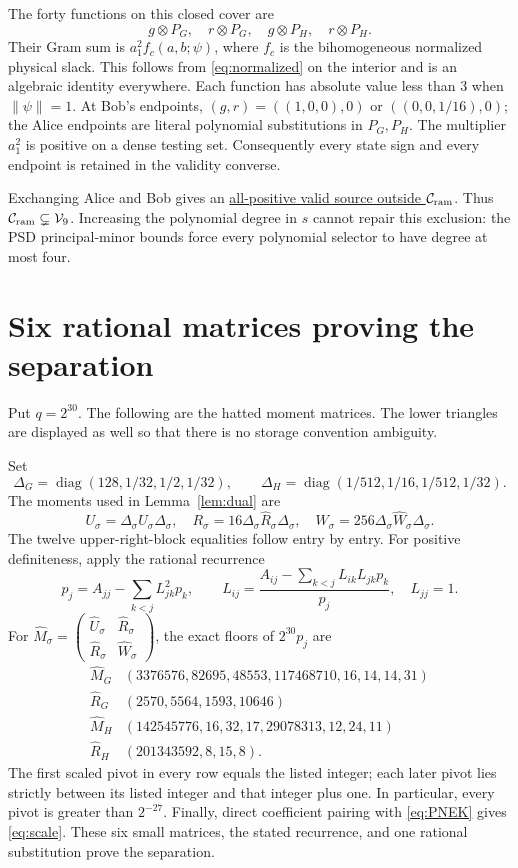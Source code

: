 \documentclass[10pt]{article}
\newcommand{\V}{\mathcal V_9}
\newcommand{\Cr}{\mathcal C_{\rm ram}}
\newcommand{\diag}{\operatorname{diag}}
\begin{document}
The forty functions on this closed cover are
\[
                 g\otimes P_G,\quad r\otimes P_G,
                 \quad g\otimes P_H,\quad r\otimes P_H.
\]
Their Gram sum is $a_1^2f_c(a,b;\psi)$, where $f_c$ is the bihomogeneous
normalized physical slack. This follows from \eqref{eq:normalized} on the
interior and is an algebraic identity everywhere. Each function has absolute
value less than $3$ when $\|\psi\|=1$. At Bob's endpoints,
$(g,r)=((1,0,0),0)$ or $((0,0,1/16),0)$; the Alice endpoints are literal
polynomial substitutions in $P_G,P_H$. The multiplier $a_1^2$ is positive
on a dense testing set. Consequently every state sign and every endpoint
is retained in the validity converse.

Exchanging Alice and Bob gives an
\href{../ramified-obstruction/Q222_Ramified_Quartic_Obstruction.pdf}{all-positive valid source outside $\Cr$}.
Thus $\Cr\subsetneq\V$. Increasing the polynomial degree in $s$ cannot
repair this exclusion: the PSD principal-minor bounds force every
polynomial selector to have degree at most four.

\appendix
\section{Six rational matrices proving the separation}\label{app:dual}
Put $q=2^{30}$. The following are the hatted moment matrices. The lower
triangles are displayed as well so that there is no storage convention
ambiguity.

Set
\[
\Delta_G=\diag(128,1/32,1/2,1/32),\qquad
\Delta_H=\diag(1/512,1/16,1/512,1/32).
\]
The moments used in Lemma~\ref{lem:dual} are
\[
U_\sigma=\Delta_\sigma\widehat U_\sigma\Delta_\sigma,
\quad R_\sigma=16\Delta_\sigma\widehat R_\sigma\Delta_\sigma,
\quad W_\sigma=256\Delta_\sigma\widehat W_\sigma\Delta_\sigma.
\]
The twelve upper-right-block equalities follow entry by entry. For positive
definiteness, apply the rational recurrence
\[
p_j=A_{jj}-\sum_{k<j}L_{jk}^2p_k,\qquad
L_{ij}=\frac{A_{ij}-\sum_{k<j}L_{ik}L_{jk}p_k}{p_j},\quad L_{jj}=1.
\]
For $\widehat M_\sigma=\left(\begin{smallmatrix}
\widehat U_\sigma&\widehat R_\sigma\\
\widehat R_\sigma&\widehat W_\sigma\end{smallmatrix}\right)$,
the exact floors of $2^{30}p_j$ are
\[
\begin{array}{c|l}
\widehat M_G&(3376576,82695,48553,117468710,16,14,14,31)\\
\widehat R_G&(2570,5564,1593,10646)\\
\widehat M_H&(142545776,16,32,17,29078313,12,24,11)\\
\widehat R_H&(201343592,8,15,8).
\end{array}
\]
The first scaled pivot in every row equals the listed integer; each later
pivot lies strictly between its listed integer and that integer plus one.
In particular, every pivot is greater than $2^{-27}$.
Finally, direct coefficient pairing with \eqref{eq:PNEK} gives
\eqref{eq:scale}. These six small matrices, the stated recurrence, and one
rational substitution prove the separation.


\end{document}
